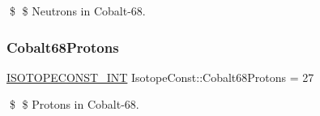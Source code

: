 \$ \$ Neutrons in Cobalt-\/68. \mbox{\label{group___isotope_const-_cobalt-_co68_ga51f6ebc99e6789af537eba710201b7fd}} 
\subsubsection{\texorpdfstring{Cobalt68\+Protons}{Cobalt68Protons}}
{\footnotesize\ttfamily \mbox{\hyperlink{group___isotope_const-_macros_ga5f18360b3e99483a35c32d789e62621c}{I\+S\+O\+T\+O\+P\+E\+C\+O\+N\+S\+T\+\_\+\+I\+NT}} Isotope\+Const\+::\+Cobalt68\+Protons = 27}

\$ \$ Protons in Cobalt-\/68. 